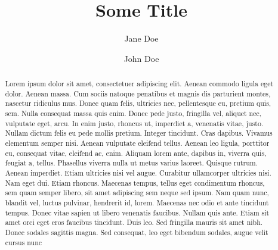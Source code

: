 \documentclass[]{cik}%
\begin{document}
\captionsetup[table]{labelformat=empty}
\captionsetup[figure]{labelformat=empty}
\raggedbottom

\title{Some Title}



  \author[1,2,*]
  {Jane Doe}
  \author[1]
  {John Doe}



\address{ \\ }
\subject{
Subject1Subject2
}






\begin{abstract}
Lorem ipsum dolor sit amet, consectetuer adipiscing elit. Aenean commodo
ligula eget dolor. Aenean massa. Cum sociis natoque penatibus et magnis
dis parturient montes, nascetur ridiculus mus. Donec quam felis,
ultricies nec, pellentesque eu, pretium quis, sem. Nulla consequat massa
quis enim. Donec pede justo, fringilla vel, aliquet nec, vulputate eget,
arcu. In enim justo, rhoncus ut, imperdiet a, venenatis vitae, justo.
Nullam dictum felis eu pede mollis pretium. Integer tincidunt. Cras
dapibus. Vivamus elementum semper nisi. Aenean vulputate eleifend
tellus. Aenean leo ligula, porttitor eu, consequat vitae, eleifend ac,
enim. Aliquam lorem ante, dapibus in, viverra quis, feugiat a, tellus.
Phasellus viverra nulla ut metus varius laoreet. Quisque rutrum. Aenean
imperdiet. Etiam ultricies nisi vel augue. Curabitur ullamcorper
ultricies nisi. Nam eget dui. Etiam rhoncus. Maecenas tempus, tellus
eget condimentum rhoncus, sem quam semper libero, sit amet adipiscing
sem neque sed ipsum. Nam quam nunc, blandit vel, luctus pulvinar,
hendrerit id, lorem. Maecenas nec odio et ante tincidunt tempus. Donec
vitae sapien ut libero venenatis faucibus. Nullam quis ante. Etiam sit
amet orci eget eros faucibus tincidunt. Duis leo. Sed fringilla mauris
sit amet nibh. Donec sodales sagittis magna. Sed consequat, leo eget
bibendum sodales, augue velit cursus nunc
\end{abstract}
\end{document}
